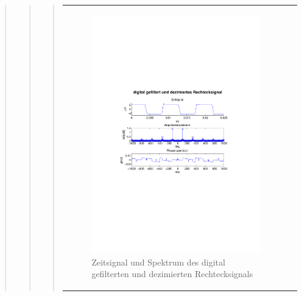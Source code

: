 \begin{quote}
\begin{quote}
\begin{quote}
\begin{center}
\begin{tabular}{ll}
\begin{minipage}{0.6\textwidth}
                        \begin{figure}[H]
                            \label{fig:}
                            \includegraphics[scale=0.5, trim = 1.5cm 7cm 1.5cm 8.5cm,
                            clip]{./Bilder/rechteck15kHz_digifilt+dezi}
                            \caption{Zeitsignal und Spektrum des digital
                            gefilterten und dezimierten Rechtecksignals}
                        \end{figure}
                    \vspace{-1.5em}
    
                    \end{minipage}
    
                \end{tabular}
                \end{center}
        	

\end{quote}
\end{quote}
\end{quote}
